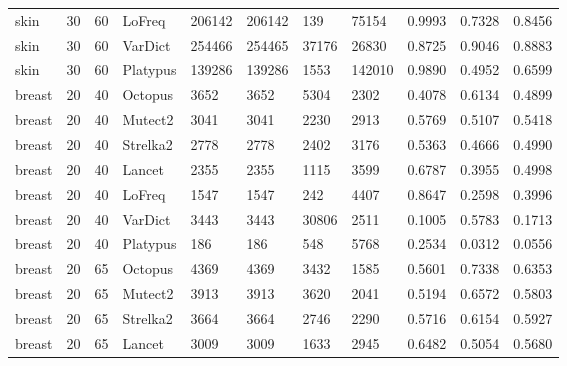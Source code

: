 \documentclass{article}
\begin{document}
\begin{table}[ht!]
{\begin{tabular}{lrrllllllll}
   skin &            30 &            60 &    LoFreq &            206142 &        206142 &       139 &     75154 &    0.9993 &      0.7328 &    0.8456 \\
   skin &            30 &            60 &   VarDict &            254466 &        254465 &     37176 &     26830 &    0.8725 &      0.9046 &    0.8883 \\
   skin &            30 &            60 &  Platypus &            139286 &        139286 &      1553 &    142010 &    0.9890 &      0.4952 &    0.6599 \\
 breast &            20 &            40 &   Octopus &              3652 &          3652 &      5304 &      2302 &    0.4078 &      0.6134 &    0.4899 \\
 breast &            20 &            40 &   Mutect2 &              3041 &          3041 &      2230 &      2913 &    0.5769 &      0.5107 &    0.5418 \\
 breast &            20 &            40 &  Strelka2 &              2778 &          2778 &      2402 &      3176 &    0.5363 &      0.4666 &    0.4990 \\
 breast &            20 &            40 &    Lancet &              2355 &          2355 &      1115 &      3599 &    0.6787 &      0.3955 &    0.4998 \\
 breast &            20 &            40 &    LoFreq &              1547 &          1547 &       242 &      4407 &    0.8647 &      0.2598 &    0.3996 \\
 breast &            20 &            40 &   VarDict &              3443 &          3443 &     30806 &      2511 &    0.1005 &      0.5783 &    0.1713 \\
 breast &            20 &            40 &  Platypus &               186 &           186 &       548 &      5768 &    0.2534 &      0.0312 &    0.0556 \\
 breast &            20 &            65 &   Octopus &              4369 &          4369 &      3432 &      1585 &    0.5601 &      0.7338 &    0.6353 \\
 breast &            20 &            65 &   Mutect2 &              3913 &          3913 &      3620 &      2041 &    0.5194 &      0.6572 &    0.5803 \\
 breast &            20 &            65 &  Strelka2 &              3664 &          3664 &      2746 &      2290 &    0.5716 &      0.6154 &    0.5927 \\
 breast &            20 &            65 &    Lancet &              3009 &          3009 &      1633 &      2945 &    0.6482 &      0.5054 &    0.5680 \\

\end{tabular}}
\end{table}
\end{document}

